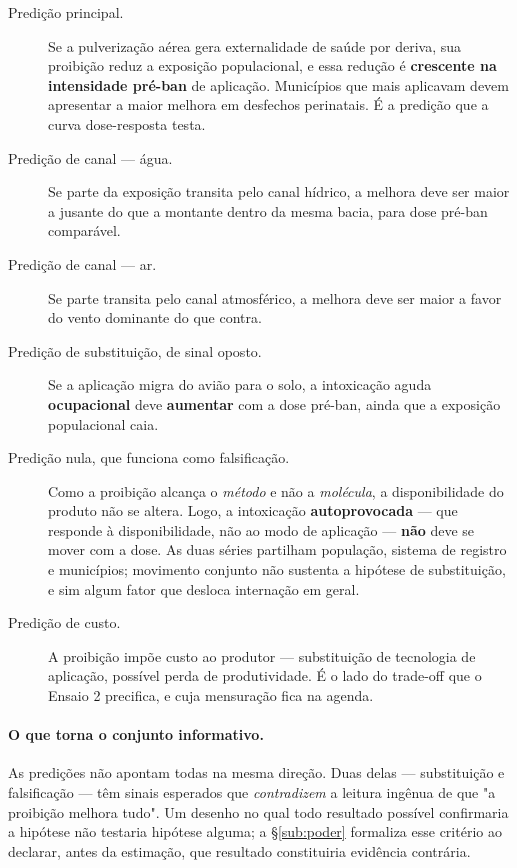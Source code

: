 \begin{description}
  \item[Predição principal.] Se a pulverização aérea gera externalidade de saúde
    por deriva, sua proibição reduz a exposição populacional, e essa redução é
    \textbf{crescente na intensidade pré-ban} de aplicação. Municípios que mais
    aplicavam devem apresentar a maior melhora em desfechos perinatais. É a
    predição que a curva dose-resposta testa.

  \item[Predição de canal --- água.] Se parte da exposição transita pelo canal
    hídrico, a melhora deve ser maior a jusante do que a montante dentro da mesma
    bacia, para dose pré-ban comparável.

  \item[Predição de canal --- ar.] Se parte transita pelo canal atmosférico, a
    melhora deve ser maior a favor do vento dominante do que contra.

  \item[Predição de substituição, de sinal oposto.] Se a aplicação migra do
    avião para o solo, a intoxicação aguda \textbf{ocupacional} deve
    \textbf{aumentar} com a dose pré-ban, ainda que a exposição populacional
    caia.

  \item[Predição nula, que funciona como falsificação.] Como a proibição alcança
    o \emph{método} e não a \emph{molécula}, a disponibilidade do produto não se
    altera. Logo, a intoxicação \textbf{autoprovocada} --- que responde à
    disponibilidade, não ao modo de aplicação --- \textbf{não} deve se mover com
    a dose. As duas séries partilham população, sistema de registro e municípios;
    movimento conjunto não sustenta a hipótese de substituição, e sim algum fator
    que desloca internação em geral.

  \item[Predição de custo.] A proibição impõe custo ao produtor --- substituição
    de tecnologia de aplicação, possível perda de produtividade. É o lado do
    trade-off que o Ensaio 2 precifica, e cuja mensuração fica na agenda.
\end{description}

\paragraph{O que torna o conjunto informativo.} As predições não apontam todas na
mesma direção. Duas delas --- substituição e falsificação --- têm sinais
esperados que \emph{contradizem} a leitura ingênua de que "a proibição melhora
tudo". Um desenho no qual todo resultado possível confirmaria a hipótese não
testaria hipótese alguma; a §\ref{sub:poder} formaliza esse critério ao declarar,
antes da estimação, que resultado constituiria evidência contrária.
